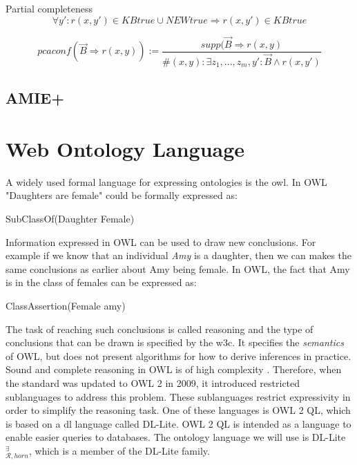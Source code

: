 Partial completeness
\[\forall y' : r(x, y') \in KBtrue \cup NEWtrue \Rightarrow r(x, y') \in KBtrue\]

\[pcaconf(\vec{B}\Rightarrow r(x, y)) := \frac{supp(\vec{B}\Rightarrow r(x, y)}{\#(x, y):\exists z_1 ,..., z_m, y' : \vec{B} \wedge r(x, y')}\]


\subsection{AMIE+}

\iffalse 
\section{Web Ontology Language}
A widely used formal language for expressing ontologies is the \gls{owl}. In OWL "Daughters are female" could be formally expressed as:

\centerline{\textsf{SubClassOf(Daughter Female)}}
Information expressed in OWL can be used to draw new conclusions. For example if we know that an individual \emph{Amy} is a daughter, then we can makes the same conclusions as earlier about Amy being female. In OWL, the fact that Amy is in the class of females can be expressed as:

\centerline{\textsf{ClassAssertion(Female amy)}}
The task of reaching such conclusions is called reasoning and the type of conclusions that can be drawn is specified by the \gls{w3c}. It specifies the \emph{semantics} of OWL, but does not present algorithms for how to derive inferences in practice. Sound and complete reasoning in OWL is of high complexity \cite{Krotzsch2012}. Therefore, when the standard was updated to OWL 2 in 2009, it introduced restricted sublanguages to address this problem. These sublanguages restrict expressivity in order to simplify the reasoning task. One of these languages is OWL 2 QL, which is based on a \gls{dl} language called DL-Lite. OWL 2 QL is intended as a language to enable easier queries to databases. The ontology language we will use is DL-Lite$_{\mathcal{R}, horn}^{\exists}$, which is a member of the DL-Lite family.



